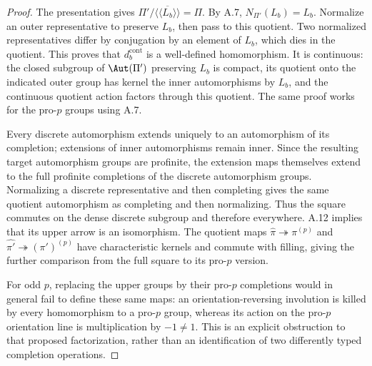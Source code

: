 \begin{proof}
The presentation gives $\Pi'/\overline{\langle\!\langle L_b\rangle\!\rangle}=\Pi$. By A.7, $N_{\Pi'}(L_b)=L_b$. Normalize an outer representative to preserve $L_b$, then pass to this quotient. Two normalized representatives differ by conjugation by an element of $L_b$, which dies in the quotient. This proves that $d_b^{\mathrm{cont}}$ is a well-defined homomorphism. It is continuous: the closed subgroup of $\Aut(\Pi')$ preserving $L_b$ is compact, its quotient onto the indicated outer group has kernel the inner automorphisms by $L_b$, and the continuous quotient action factors through this quotient. The same proof works for the pro-$p$ groups using A.7.

Every discrete automorphism extends uniquely to an automorphism of its completion; extensions of inner automorphisms remain inner. Since the resulting target automorphism groups are profinite, the extension maps themselves extend to the full profinite completions of the discrete automorphism groups. Normalizing a discrete representative and then completing gives the same quotient automorphism as completing and then normalizing. Thus the square commutes on the dense discrete subgroup and therefore everywhere. A.12 implies that its upper arrow is an isomorphism. The quotient maps $\widehat\pi\twoheadrightarrow\pi^{(p)}$ and $\widehat{\pi'}\twoheadrightarrow(\pi')^{(p)}$ have characteristic kernels and commute with filling, giving the further comparison from the full square to its pro-$p$ version.

For odd $p$, replacing the upper groups by their pro-$p$ completions would in general fail to define these same maps: an orientation-reversing involution is killed by every homomorphism to a pro-$p$ group, whereas its action on the pro-$p$ orientation line is multiplication by $-1\ne1$. This is an explicit obstruction to that proposed factorization, rather than an identification of two differently typed completion operations.
\end{proof}
